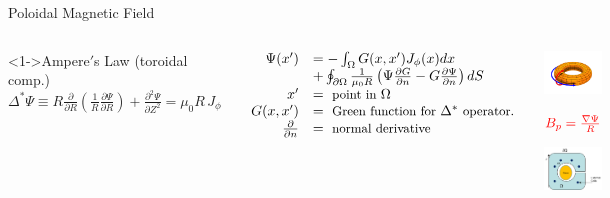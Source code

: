 \documentclass{beamer}
\begin{document}
\begin{frame}{Poloidal Magnetic Field}
\begin{columns}
\begin{block}<1->{Ampere$'$s Law { \small (toroidal comp.)}}
{ \small $ \Delta^* \Psi \equiv R \frac{\partial }{\partial R} (\frac{1}{R}  \frac{\partial \Psi }{\partial R} )  +
	\frac{\partial ^2 \Psi }{\partial Z^2}  = \mu_0 R \, J_\phi $  }
\end{block}

	$ \begin{array}{rl}
	  \Psi (x') &= - \int_\Omega G(x,x') J_\phi (x) d x  \\
	  	&+ \oint_{\partial \Omega} \frac{1}{\mu_0 R} \left ( \Psi  \frac{\partial G }{\partial n}
		 - G \frac{\partial \Psi }{\partial n} \right ) dS \\
		x' &= \textrm{ \small point in } \Omega \\
		G(x,x')  &= \textrm{ \small  Green function for } \Delta^* \textrm{ \small operator.} \\
		 \frac{\partial  }{\partial n}   &= \textrm{ \small normal derivative}
	 \end{array} $

	\begin{center}
		\includegraphics[width=.7\columnwidth]{torsurf.png}

		$\color{red} B_{p} = \frac{\nabla \Psi}{R} $

		\includegraphics[width=.55\columnwidth]{xsection.png}
	\end{center}
\end{columns}
\end{frame}
\end{document}
